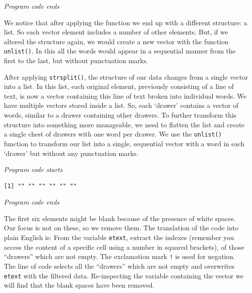 \emph{Program code ends}

We notice that after applying the function we end up with a different
structure: a list. So each vector element includes a number of other elements. But,
if we altered the structure again, we would create a new vector with the
function \texttt{unlist()}. In this all the words would appear in a
sequential manner from the first to the last, but without punctuation
marks.

After applying \texttt{strsplit()}, the structure of our data changes
from a single vector into a list. In this list, each original element,
previously consisting of a line of text, is now a vector containing this
line of text broken into individual words. We have multiple vectors
stored inside a list. So, each `drawer' contains a vector of words,
similar to a drawer containing other drawers. To further transform this
structure into something more manageable, we need to flatten the list
and create a single chest of drawers with one word per drawer. We use
the \texttt{unlist()} function to transform our list into a single,
sequential vector with a word in each `drawer' but without any
punctuation marks.

\emph{Program code starts}

\begin{Shaded}
\begin{Highlighting}[]
\OtherTok{\textless{}{-}} 
\end{Highlighting}
\end{Shaded}

\begin{verbatim}
[1] "" "" "" "" "" ""
\end{verbatim}

\emph{Program code ends}

The first six elements might be blank because of the presence of white spaces. Our
focus is not on these, so we remove them. The
translation of the code into plain English is: From the variable
\texttt{etext}, extract the indexes (remember you access the content of a specific
cell using a number in squared brackets), of those
``drawers'' which are not empty. The exclamation mark \texttt{!} is used
for negation. The line of code selects all the ``drawers'' which are not
empty and overwrites \texttt{etext} with the filtered data.
Re-inspecting the variable containing the vector we will find that
the blank spaces have been removed.

